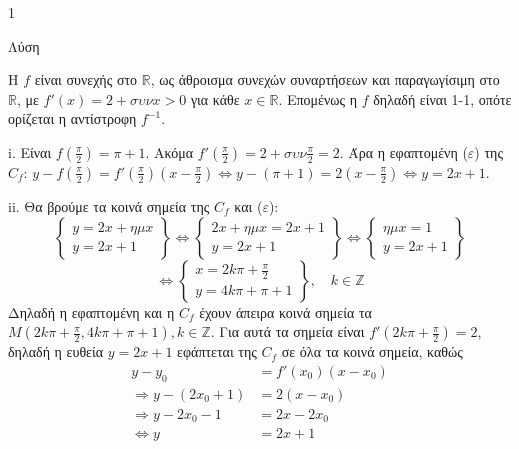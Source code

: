 \begin{ylh}{1}
    \item [Ύλη από εικόνα]
\end{ylh}
Λύση
\begin{alist}
\item [\(\alpha\)] Η $f$ είναι συνεχής στο $\mathbb{R}$, ως άθροισμα συνεχών συναρτήσεων και παραγωγίσιμη στο $\mathbb{R}$, με $f'(x)=2+\sigma\upsilon\nu x > 0$ για κάθε $x \in \mathbb{R}$. Επομένως η $f$ δηλαδή είναι 1-1, οπότε ορίζεται η αντίστροφη $f^{-1}$.

\item [\(\beta\)]
\begin{rlist}
\item i. Είναι $f\left(\frac{\pi}{2}\right)=\pi+1$. Ακόμα $f'\left(\frac{\pi}{2}\right)=2+\sigma\upsilon\nu\frac{\pi}{2}=2$.
Άρα η εφαπτομένη ($\varepsilon$) της $C_f$: $y-f\left(\frac{\pi}{2}\right)=f'\left(\frac{\pi}{2}\right)\left(x-\frac{\pi}{2}\right) \Leftrightarrow y-(\pi+1)=2\left(x-\frac{\pi}{2}\right) \Leftrightarrow y=2x+1$.

\item ii. Θα βρούμε τα κοινά σημεία της $C_f$ και ($\varepsilon$):
\[ \left\{ \begin{array}{l} y=2x+\eta\mu x \\ y=2x+1 \end{array} \right\} \Leftrightarrow \left\{ \begin{array}{l} 2x+\eta\mu x = 2x+1 \\ y=2x+1 \end{array} \right\} \Leftrightarrow \left\{ \begin{array}{l} \eta\mu x = 1 \\ y=2x+1 \end{array} \right\} \]
\[ \Leftrightarrow \left\{ \begin{array}{l} x=2k\pi+\frac{\pi}{2} \\ y=4k\pi+\pi+1 \end{array} \right\}, \quad k \in \mathbb{Z} \]
Δηλαδή η εφαπτομένη και η $C_f$ έχουν άπειρα κοινά σημεία τα $M\left(2k\pi+\frac{\pi}{2}, 4k\pi+\pi+1\right), k \in \mathbb{Z}$.
Για αυτά τα σημεία είναι $f'\left(2k\pi+\frac{\pi}{2}\right)=2$, δηλαδή η ευθεία $y=2x+1$ εφάπτεται της $C_f$ σε όλα τα κοινά σημεία, καθώς
\begin{align*}
y-y_0 &= f'(x_0)(x-x_0) \\
\Rightarrow y-(2x_0+1) &= 2(x-x_0) \\
\Rightarrow y-2x_0-1 &= 2x-2x_0 \\
\Leftrightarrow y&=2x+1
\end{align*}
\end{rlist}


\end{alist}
